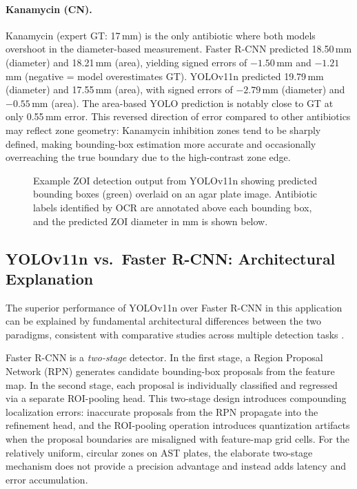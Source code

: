 \paragraph{Kanamycin (CN).}
Kanamycin (expert GT: 17\,mm) is the only antibiotic where both models overshoot
in the diameter-based measurement.
Faster R-CNN predicted 18.50\,mm (diameter) and 18.21\,mm (area),
yielding signed errors of $-1.50$\,mm and $-1.21$\,mm (negative = model overestimates GT).
YOLOv11n predicted 19.79\,mm (diameter) and 17.55\,mm (area),
with signed errors of $-2.79$\,mm (diameter) and $-0.55$\,mm (area).
The area-based YOLO prediction is notably close to GT at only 0.55\,mm error.
This reversed direction of error compared to other antibiotics may reflect
zone geometry: Kanamycin inhibition zones tend to be sharply defined,
making bounding-box estimation more accurate and occasionally overreaching
the true boundary due to the high-contrast zone edge.

\begin{figure}[H]
  \centering
  \caption{Example ZOI detection output from YOLOv11n showing predicted bounding boxes
           (green) overlaid on an agar plate image.
           Antibiotic labels identified by OCR are annotated above each bounding box,
           and the predicted ZOI diameter in mm is shown below.}
  \label{fig:detection_result}
\end{figure}

\subsection{YOLOv11n vs.\ Faster R-CNN: Architectural Explanation}

The superior performance of YOLOv11n over Faster R-CNN in this application
can be explained by fundamental architectural differences between the two paradigms,
consistent with comparative studies across multiple detection tasks \cite{sharma2024yolo_comparison}.

Faster R-CNN \cite{ren2015faster} is a \emph{two-stage} detector.
In the first stage, a Region Proposal Network (RPN) generates candidate bounding-box proposals
from the feature map.
In the second stage, each proposal is individually classified and regressed via a separate
ROI-pooling head.
This two-stage design introduces compounding localization errors:
inaccurate proposals from the RPN propagate into the refinement head,
and the ROI-pooling operation introduces quantization artifacts when the
proposal boundaries are misaligned with feature-map grid cells.
For the relatively uniform, circular zones on AST plates,
the elaborate two-stage mechanism does not provide a precision advantage
and instead adds latency and error accumulation.


